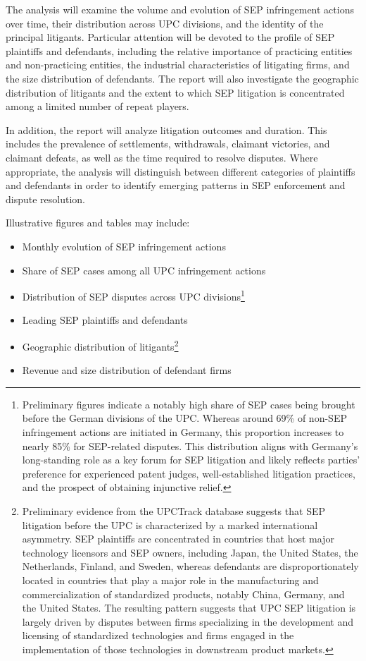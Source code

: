 \documentclass[12pt]{article}
\begin{document}
The analysis will examine the volume and evolution of SEP infringement actions over time, their distribution across UPC divisions, and the identity of the principal litigants. Particular attention will be devoted to the profile of SEP plaintiffs and defendants, including the relative importance of practicing entities and non-practicing entities, the industrial characteristics of litigating firms, and the size distribution of defendants. The report will also investigate the geographic distribution of litigants and the extent to which SEP litigation is concentrated among a limited number of repeat players.

In addition, the report will analyze litigation outcomes and duration. This includes the prevalence of settlements, withdrawals, claimant victories, and claimant defeats, as well as the time required to resolve disputes. Where appropriate, the analysis will distinguish between different categories of plaintiffs and defendants in order to identify emerging patterns in SEP enforcement and dispute resolution.

Illustrative figures and tables may include:

\begin{itemize}
\item Monthly evolution of SEP infringement actions
\item Share of SEP cases among all UPC infringement actions
\item Distribution of SEP disputes across UPC divisions\footnote{Preliminary figures indicate a notably high share of SEP cases being brought before the German divisions of the UPC. Whereas around 69\% of non-SEP infringement actions are initiated in Germany, this proportion increases to nearly 85\% for SEP-related disputes. This distribution aligns with Germany’s long-standing role as a key forum for SEP litigation and likely reflects parties’ preference for experienced patent judges, well-established litigation practices, and the prospect of obtaining injunctive relief.}
\item Leading SEP plaintiffs and defendants
\item Geographic distribution of litigants\footnote{Preliminary evidence from the UPCTrack database suggests that SEP litigation before the UPC is characterized by a marked international asymmetry. SEP plaintiffs are concentrated in countries that host major technology licensors and SEP owners, including Japan, the United States, the Netherlands, Finland, and Sweden, whereas defendants are disproportionately located in countries that play a major role in the manufacturing and commercialization of standardized products, notably China, Germany, and the United States. The resulting pattern suggests that UPC SEP litigation is largely driven by disputes between firms specializing in the development and licensing of standardized technologies and firms engaged in the implementation of those technologies in downstream product markets.}
\item Revenue and size distribution of defendant firms
\end{itemize}
\end{document}
